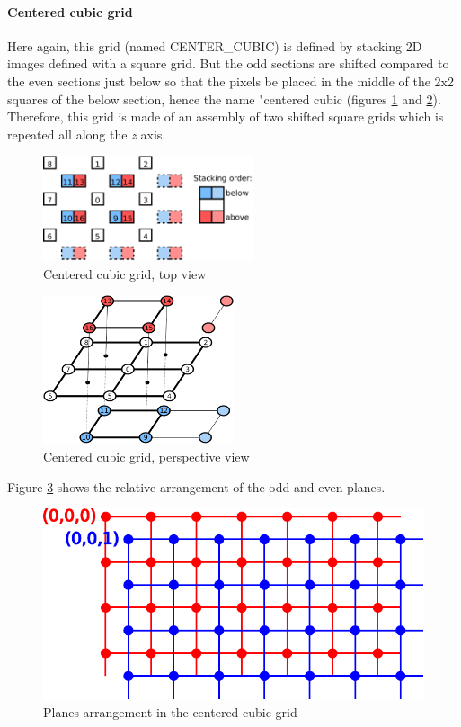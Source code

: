 \documentclass[a4paper,10pt,oneside]{article}
\begin{document}
\paragraph{Centered cubic grid\\}

Here again, this grid (named CENTER\_CUBIC) is defined by stacking 2D images defined with a square grid. But the odd sections
are shifted compared to the even sections just below so that the pixels be placed in the middle of the 2x2 squares of the below
section, hence the name "centered cubic (figures \ref{fig:ccubic_grid} and \ref{fig:ccubic_grid_3D}). Therefore, this grid is
made of an assembly of two shifted square grids which is repeated all along the \emph{z} axis.

\begin{figure}
\centering
\includegraphics[width=0.55\textwidth]{figures/ccubic_grid.pdf}
\caption{Centered cubic grid, top view}
\label{fig:ccubic_grid}
\end{figure}

\begin{figure}
\centering
\includegraphics[width=0.5\textwidth]{figures/Ccubic_grid_3D.pdf}
\caption{Centered cubic grid, perspective view}
\label{fig:ccubic_grid_3D}
\end{figure}

Figure \ref{fig:CC_grid} shows the relative arrangement of the odd and even planes.

\begin{figure}
\centering
\includegraphics[scale=0.8]{figures/CC_grid.pdf}
\caption{Planes arrangement in the centered cubic grid}
\label{fig:CC_grid}
\end{figure}
\end{document}
